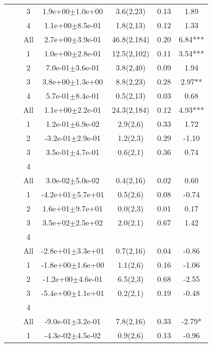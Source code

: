 \begin{longtable}{llccccS[table-format=-2.2, table-space-text-post = {***}]}
   &  & 3 &  1.9e+00$\pm$1.0e+00 & 3.6(2,23) & 0.13 & 1.89 \\ 
   &  & 4 &  1.1e+00$\pm$8.5e-01 & 1.8(2,13) & 0.12 & 1.33 \\ 
   &  & All &  2.7e+00$\pm$3.9e-01 & 46.8(2,184) & 0.20 & 6.84*** \\ 
   \midrule
{} & {} & 1 &  1.0e+00$\pm$2.8e-01 & 12.5(2,102) & 0.11 & 3.54*** \\ 
   &  & 2 &  7.0e-01$\pm$3.6e-01 & 3.8(2,40) & 0.09 & 1.94 \\ 
   &  & 3 &  3.8e+00$\pm$1.3e+00 & 8.8(2,23) & 0.28 & 2.97** \\ 
   &  & 4 &  5.7e-01$\pm$8.4e-01 & 0.5(2,13) & 0.03 & 0.68 \\ 
   &  & All &  1.1e+00$\pm$2.2e-01 & 24.3(2,184) & 0.12 & 4.93*** \\ 
   \midrule
{} & {} & 1 &  1.2e-01$\pm$6.9e-02 & 2.9(2,6) & 0.33 & 1.72 \\ 
   &  & 2 & -3.2e-01$\pm$2.9e-01 & 1.2(2,3) & 0.29 & -1.10 \\ 
   &  & 3 &  3.5e-01$\pm$4.7e-01 & 0.6(2,1) & 0.36 & 0.74 \\ 
   &  & 4 &  &  &  &  \\ 
   &  & All &  3.0e-02$\pm$5.0e-02 & 0.4(2,16) & 0.02 & 0.60 \\ 
   \midrule
{} & {} & 1 & -4.2e+01$\pm$5.7e+01 & 0.5(2,6) & 0.08 & -0.74 \\ 
   &  & 2 &  1.6e+01$\pm$9.7e+01 & 0.0(2,3) & 0.01 & 0.17 \\ 
   &  & 3 &  3.5e+02$\pm$2.5e+02 & 2.0(2,1) & 0.67 & 1.42 \\ 
   &  & 4 &  &  &  &  \\ 
   &  & All & -2.8e+01$\pm$3.3e+01 & 0.7(2,16) & 0.04 & -0.86 \\ 
   \midrule
{} & {} & 1 & -1.8e+00$\pm$1.6e+00 & 1.1(2,6) & 0.16 & -1.06 \\ 
   &  & 2 & -1.2e+00$\pm$4.6e-01 & 6.5(2,3) & 0.68 & -2.55 \\ 
   &  & 3 & -5.4e+00$\pm$1.1e+01 & 0.2(2,1) & 0.19 & -0.48 \\ 
   &  & 4 &  &  &  &  \\ 
   &  & All & -9.0e-01$\pm$3.2e-01 & 7.8(2,16) & 0.33 & -2.79* \\ 
   \midrule
{} & {} & 1 & -4.3e-02$\pm$4.5e-02 & 0.9(2,6) & 0.13 & -0.96 \\ 

\end{longtable}
